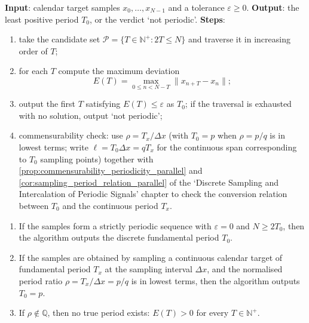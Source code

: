 \begin{definition}\label{def:calendar_minimal_period_algorithm}
\textbf{Input}: calendar target samples \(x_0,\dots,x_{N-1}\) and a tolerance \(\varepsilon\ge0\).
\textbf{Output}: the least positive period \(T_0\), or the verdict `not periodic'.
\textbf{Steps}:
\begin{enumerate}[label=(\arabic*)]
    \item take the candidate set \(\mathcal P=\{T\in\mathbb N^+:2T\le N\}\) and traverse it in increasing order of \(T\);
    \item for each \(T\) compute the maximum deviation
    \[
    E(T)=\max_{0\le n<N-T}\|x_{n+T}-x_n\|;
    \]
    \item output the first \(T\) satisfying \(E(T)\le\varepsilon\) as \(T_0\); if the traversal is exhausted with no solution, output `not periodic';
    \item commensurability check: use \(\rho=T_x/\Delta x\) (with \(T_0=p\) when \(\rho=p/q\) is in lowest terms; write \(\ell=T_0\Delta x=qT_x\) for the continuous span corresponding to \(T_0\) sampling points) together with \cref{prop:commensurability_periodicity_parallel} and \cref{cor:sampling_period_relation_parallel} of the `Discrete Sampling and Intercalation of Periodic Signals' chapter to check the conversion relation between \(T_0\) and the continuous period \(T_x\).
\end{enumerate}
\end{definition}

\begin{theorem}\label{thm:calendar_minimal_period_correctness}
\begin{enumerate}[label=(\roman*)]
    \item If the samples form a strictly periodic sequence with \(\varepsilon=0\) and \(N\ge2T_0\), then the algorithm outputs the discrete fundamental period \(T_0\).
    \item If the samples are obtained by sampling a continuous calendar target of fundamental period \(T_x\) at the sampling interval \(\Delta x\), and the normalised period ratio \(\rho=T_x/\Delta x=p/q\) is in lowest terms, then the algorithm outputs \(T_0=p\).
    \item If \(\rho\notin\mathbb Q\), then no true period exists: \(E(T)>0\) for every \(T\in\mathbb N^+\).
\end{enumerate}
\end{theorem}

